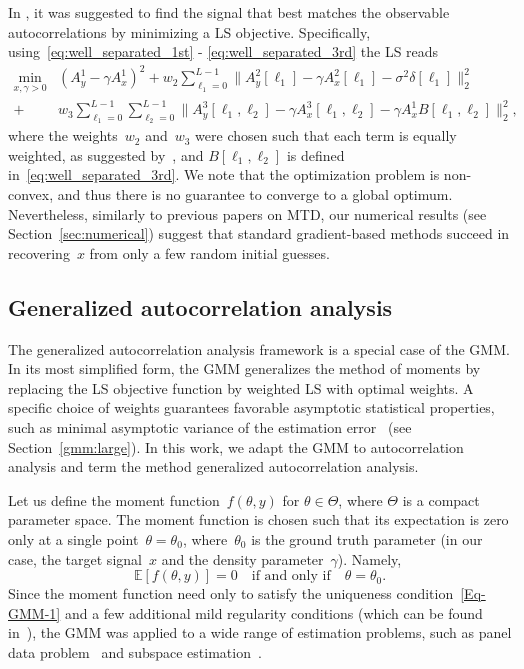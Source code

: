 \documentclass{article}
\newcommand{\E}[0]{\mathbb{E}}
\newcommand{\R}[0]{\mathbb{R}}
\begin{document}
In \cite{bendory2019multi,lan2020multi,marshall2020image,bendory2021multi,kreymer2021two}, it was suggested to find the signal that best matches the observable autocorrelations by minimizing a LS objective. Specifically, using~\eqref{eq:well_separated_1st} - \eqref{eq:well_separated_3rd} the LS reads
\begin{align}
\label{eq:optimization}
\min_{x, \gamma > 0} & (A_y^1 - \gamma A_x^1)^2  + w_2 \sum_{\ell_1 = 0}^{L - 1} \|A_y^2[\ell_1] - \gamma A_x^2[\ell_1] - \sigma^2 \delta[\ell_1]\|_2^2\nonumber\\ +& w_3 \sum_{\ell_1 = 0}^{L - 1} \sum_{\ell_2 = 0}^{L - 1} \|A_y^3[\ell_1, \ell_2] - \gamma A_x^3[\ell_1, \ell_2] - \gamma A_{x}^1 B[\ell_1, \ell_2]\|_2^2,
\end{align}
where the weights~$w_2$ and~$w_3$ were chosen such that each term is equally weighted, as suggested by~\cite{bendory2019multi}, and $B[\ell_1, \ell_2]$ is defined in~\eqref{eq:well_separated_3rd}. We note that the optimization problem is non-convex, and thus there is no guarantee to converge to a global optimum. Nevertheless, similarly to previous papers on MTD, our numerical results (see Section~\ref{sec:numerical}) suggest that standard gradient-based methods succeed in recovering~$x$ from only a few random initial guesses.

\subsection{Generalized autocorrelation analysis}
\label{subsec:generalized_ac}
The generalized autocorrelation analysis framework is a special case of the GMM.  In its most simplified form, the GMM generalizes the method of moments by replacing the LS objective function by  weighted LS with  optimal weights. A specific  choice of weights guarantees favorable asymptotic statistical properties, such as  minimal asymptotic variance of the estimation error~\cite{Hansen1982} {(see Section~\ref{gmm:large})}. In this work, we adapt the GMM to autocorrelation analysis and term the method generalized autocorrelation analysis.

Let us define the moment function~$f(\theta, y)$  for $\theta\in\Theta$, where $\Theta$ is a compact parameter space. 
 The moment function is chosen such that its expectation is zero only at a single point~$\theta=\theta_0$, where~$\theta_0$ is the ground truth parameter (in our case, the target signal~$x$ and the density parameter~$\gamma$). Namely,
\begin{equation}\label{Eq-GMM-1}
	\E\left[f(\theta,y)\right] = 0 \quad \text{if and only if} \quad \theta = \theta_0.
\end{equation}
Since the moment function need only to satisfy the uniqueness condition~\eqref{Eq-GMM-1} and a few additional mild regularity conditions (which can be found in~\cite{Hansen1982,Hall2005,abas2021generalized}), the GMM was applied to a wide range of estimation problems,  such as panel data problem~\cite{blundell2000gmm} and subspace estimation~\cite{fan2018optimal}.
\end{document}
